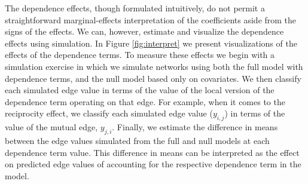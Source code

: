 \documentclass[reqno,onecolumn,letterpaper,12pt]{article}
\begin{document}
The dependence effects, though formulated intuitively, do not permit a straightforward marginal-effects interpretation of the coefficients aside from the signs of the effects. We can, however, estimate and visualize the dependence effects using simulation. In Figure \ref{fig:interpret} we present visualizations of the effects of the dependence terms. To measure these effects we begin with a simulation exercise in which we simulate networks using both the full model with dependence terms, and the null model based only on covariates. We then classify each simulated edge value in terms of the value of the local version of the dependence term operating on that edge. For example, when it comes to the reciprocity effect, we classify each simulated edge value ($y_{i,j}$) in terms of the value of the mutual edge, $y_{j,i}$. Finally, we estimate the difference in means between the edge values simulated from the full and null models at each dependence term value. This difference in means can be interpreted as the effect on predicted edge values of accounting for the respective dependence term in the model.
\end{document}
